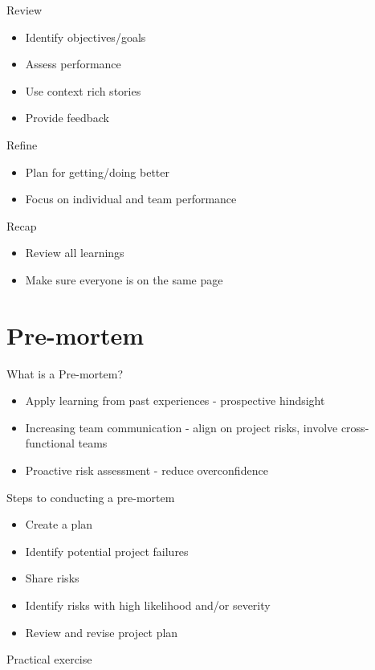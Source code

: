 \documentclass[aspectratio=169]{beamer}
\begin{document}
\begin{frame}{Review}
    \begin{itemize}
        \item Identify objectives/goals
        \item Assess performance
        \item Use context rich stories
        \item Provide feedback
    \end{itemize}
\end{frame}
\begin{frame}{Refine}
    \begin{itemize}
        \item Plan for getting/doing better
        \item Focus on individual and team performance
    \end{itemize}
\end{frame}
\begin{frame}{Recap}
    \begin{itemize}
        \item Review all learnings
        \item Make sure everyone is on the same page
    \end{itemize}
\end{frame}
\section{Pre-mortem}
\begin{frame}{What is a Pre-mortem?}
    \begin{itemize}[<+->]
        \item Apply learning from past experiences - prospective hindsight
        \item Increasing team communication - align on project risks, involve cross-functional teams
        \item Proactive risk assessment - reduce overconfidence
    \end{itemize}
\end{frame}
\begin{frame}{Steps to conducting a pre-mortem}
    \begin{itemize}[<+->]
        \item Create a plan
        \item Identify potential project failures
        \item Share risks
        \item Identify risks with high likelihood and/or severity
        \item Review and revise project plan
    \end{itemize}
\end{frame}
\begin{frame}
    Practical exercise
\end{frame}
\end{document}
